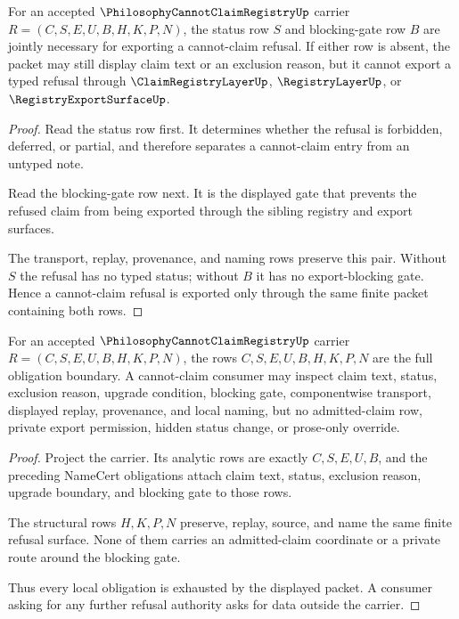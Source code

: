 \begin{theorem}
\label{thm:philosophy-cannot-claim-registry-status-exactness}
For an accepted $\PhilosophyCannotClaimRegistryUp$ carrier $R=(C,S,E,U,B,H,K,P,N)$, the status row $S$ and blocking-gate row $B$ are jointly necessary for exporting a cannot-claim refusal. If either row is absent, the packet may still display claim text or an exclusion reason, but it cannot export a typed refusal through $\ClaimRegistryLayerUp$, $\RegistryLayerUp$, or $\RegistryExportSurfaceUp$.
\end{theorem}
\begin{proof}
Read the status row first. It determines whether the refusal is forbidden, deferred, or partial, and therefore separates a cannot-claim entry from an untyped note.

Read the blocking-gate row next. It is the displayed gate that prevents the refused claim from being exported through the sibling registry and export surfaces.

The transport, replay, provenance, and naming rows preserve this pair. Without $S$ the refusal has no typed status; without $B$ it has no export-blocking gate. Hence a cannot-claim refusal is exported only through the same finite packet containing both rows.
\end{proof}

\begin{theorem}
\label{thm:philosophy-cannot-claim-registry-obligation-boundary}
For an accepted $\PhilosophyCannotClaimRegistryUp$ carrier $R=(C,S,E,U,B,H,K,P,N)$, the rows $C,S,E,U,B,H,K,P,N$ are the full obligation boundary. A cannot-claim consumer may inspect claim text, status, exclusion reason, upgrade condition, blocking gate, componentwise transport, displayed replay, provenance, and local naming, but no admitted-claim row, private export permission, hidden status change, or prose-only override.
\end{theorem}
\begin{proof}
Project the carrier. Its analytic rows are exactly $C,S,E,U,B$, and the preceding NameCert obligations attach claim text, status, exclusion reason, upgrade boundary, and blocking gate to those rows.

The structural rows $H,K,P,N$ preserve, replay, source, and name the same finite refusal surface. None of them carries an admitted-claim coordinate or a private route around the blocking gate.

Thus every local obligation is exhausted by the displayed packet. A consumer asking for any further refusal authority asks for data outside the carrier.
\end{proof}


